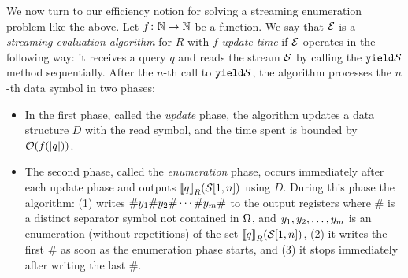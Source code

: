  
We now turn to our efficiency notion for solving a streaming enumeration problem like the above. Let $f\colon\mathbb{N}\to\mathbb{N}$ be a function. We say that $\mathcal{E}$ is a {\em streaming evaluation algorithm} for $R$ with $f$-{\em update-time} if $\mathcal{E}$ operates in the following way: it receives a query $q$ and reads the stream $\mathcal{S}$ by calling the $\texttt{yield}{\mathcal{S}}$ method sequentially. After the $n$-th call to $\texttt{yield}{\mathcal{S}}$, the algorithm processes the $n$-th data symbol in two phases:
\begin{itemize}
	\item In the first phase, called the {\em update} phase, the algorithm updates a data structure $D$ with the read symbol, and the time spent is bounded by $\mathcal{O}(f(\vert q \vert))$.
	\item The second phase, called the {\em enumeration} phase, occurs immediately after each update phase and outputs ${\llbracket{q}\rrbracket}_{R}(\mathcal{S}[1,n])$ using $D$. During this phase the algorithm:
	(1) writes $\# y_1 \# y_2\#\cdots\#y_m\#$ to the output registers where \# is a distinct separator symbol not contained in $\Omega$, and $y_1,y_2,\ldots,y_m$ is an enumeration (without repetitions) of the set ${\llbracket{q}\rrbracket}_{R}(\mathcal{S}[1,n])$,
	(2) it writes the first \# as soon as the enumeration phase starts, and 
	(3) it stops immediately after writing the last \#.
\end{itemize}

